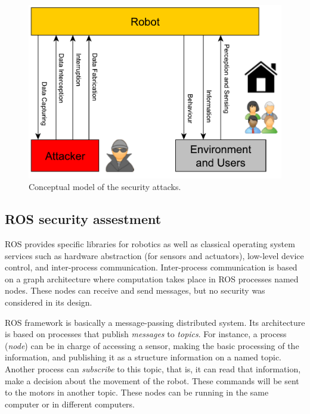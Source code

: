 \documentclass[journal,twoside]{JoPhA}
\begin{document}
\begin{figure}[ht]
    \centering
    \includegraphics[width=.5\textwidth]{RobotsAttacks.pdf}
    \caption{Conceptual model of the security attacks.}
  \label{fig:Conceptualmodel}
\end{figure}



\subsection{ROS security assestment}

ROS provides specific libraries for robotics as well as classical operating system services such as hardware abstraction (for sensors and actuators), low-level device control, and inter-process communication. Inter-process communication is based on a graph architecture where computation takes place in ROS processes named nodes. These nodes can receive and send messages, but no security was considered in its design. 

ROS framework is basically a message-passing distributed system. Its architecture is based on processes that publish {\em messages} to {\em topics}. For instance, a process ({\em node}) can be in charge of accessing a sensor, making the basic processing of the information, and publishing it as a structure information on a named topic. Another process can {\em subscribe} to this topic, that is, it can read that information, make a decision about the movement of the robot. These commands will be sent to the motors in another topic. These nodes can be running in the same computer or in different computers. 
\end{document}
